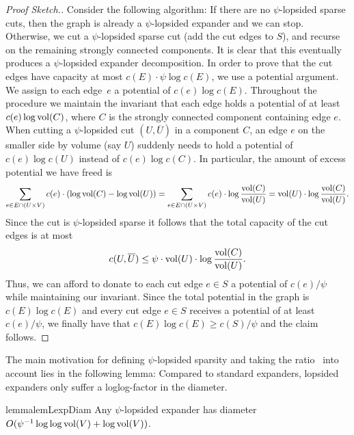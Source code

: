 \documentclass[letterpaper,11pt]{article}
\begin{document}
\begin{proof}[Proof Sketch.]
	Consider the following algorithm: If there are no $\psi$-lopsided sparse cuts, then the graph is already a $\psi$-lopsided expander and we can stop. Otherwise, we cut a $\psi$-lopsided sparse cut (add the cut edges to $S$), and recurse on the remaining strongly connected components. It is clear that this eventually produces a $\psi$-lopsided expander decomposition. In order to prove that the cut edges have capacity at most $c(E) \cdot \psi \log c(E)$, we use a potential argument. We assign to each edge~$e$ a potential of $c(e) \log c(E)$. Throughout the procedure we maintain the invariant that each edge holds a potential of at least $c(e) \log \operatorname{vol}(C)$, where $C$ is the strongly connected component containing edge $e$. When cutting a $\psi$-lopsided cut $(U, \overline U)$ in a component $C$, an edge $e$ on the smaller side by volume (say $U$) suddenly needs to hold a potential of $c(e)\log c(U)$ instead of $c(e)\log c(C)$. In particular, the amount of excess potential we have freed is
	\begin{equation*}
		\sum_{e \in E \cap (U \times V)} c(e) \cdot (\log \operatorname{vol}(C) - \log \operatorname{vol}(U)) = \sum_{e \in E \cap (U \times V)} c(e) \cdot \log \frac{\operatorname{vol}(C)}{\operatorname{vol}(U)} = \operatorname{vol}(U) \cdot \log \frac{\operatorname{vol}(C)}{\operatorname{vol}(U)}.
	\end{equation*}
	Since the cut is $\psi$-lopsided sparse it follows that the total capacity of the cut edges is at most
	\begin{equation*}
		c(U, \overline U) \leq \psi \cdot \operatorname{vol}(U) \cdot \log \frac{\operatorname{vol}(C)}{\operatorname{vol}(U)}.
	\end{equation*}
	Thus, we can afford to donate to each cut edge $e \in S$ a potential of $c(e) / \psi$ while maintaining our invariant. Since the total potential in the graph is $c(E) \log c(E)$ and every cut edge $e \in S$ receives a potential of at least $c(e) / \psi$, we finally have that $c(E) \log c(E) \geq c(S) / \psi$ and the claim follows.
\end{proof}

The main motivation for defining $\psi$-lopsided sparsity and taking the ratio~ into account lies in the following lemma: Compared to standard expanders, lopsided expanders only suffer a loglog-factor in the diameter.

\begin{restatable}{lemma}{lemLexpDiam} \label{lem:lexp-diam}
	Any $\psi$-lopsided expander has diameter $O(\psi^{-1} \log \log \operatorname{vol}(V) + \log\operatorname{vol}(V))$.
\end{restatable}
\end{document}
